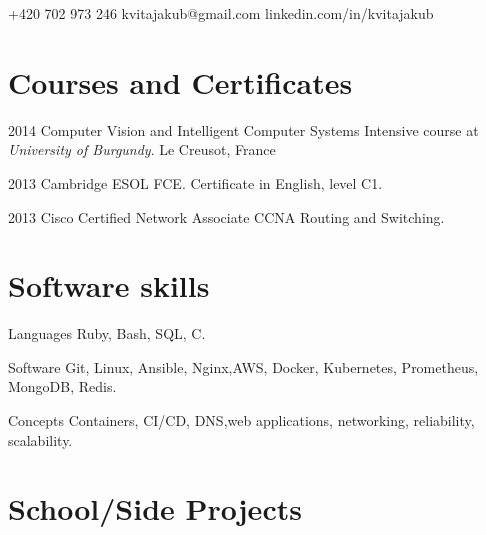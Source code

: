 \documentclass{tccv}
\begin{document}
{+420 702 973 246}
{kvitajakub@gmail.com}
{linkedin.com/in/kvitajakub}

\section{Courses and Certificates}

\begin{yearlist}
	
	\item{2014}
	{Computer Vision and Intelligent Computer Systems}
	{Intensive course at \emph{University of Burgundy}. Le Creusot, France}
	
	\item{2013}
	{Cambridge ESOL FCE.}
	{Certificate in English, level C1.}
	
	\item{2013}
	{Cisco Certified Network Associate}
	{CCNA Routing and Switching.}
	
\end{yearlist}

\section{Software skills}

\begin{factlist}
	
	\item{Languages}
	{Ruby, Bash, SQL, C.}
	
	\item{Software}
	{Git, Linux, Ansible, Nginx,\newline AWS, Docker, Kubernetes, Prometheus, MongoDB, Redis.}
	
	\item{Concepts}
	{Containers, CI/CD, DNS,\newline web applications, networking, reliability, scalability.}
	
\end{factlist}

\section{School/Side Projects}
\end{document}
